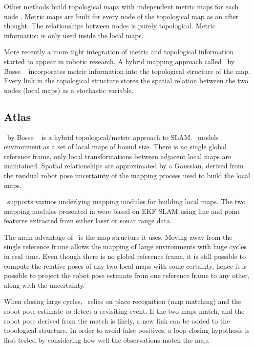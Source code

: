Other methods build topological maps with independent metric maps for
each node \cite{Cho01,Kuipers00}. Metric maps are built for every node of the
topological map as an after thought. The relationships between nodes
is purely topological. Metric information is only used inside the
local maps.

More recently a more tight integration of metric and topological
information started to appear in robotic research. A hybrid mapping
approach called \Atlas\ by Bosse \etal\ \cite{bosse03atlas} incorporates
metric information into the topological structure of the map. Every
link in the topological structure stores the spatial relation between
the two nodes (local maps) as a stochastic variable. 



\subsection{Atlas}

\Atlas\ by Bosse \etal\ \cite{bosse03atlas} is a hybrid
topological/metric approach to SLAM. \Atlas\ models environment as a
set of local maps of bound size. There is no single global reference
frame, only local transformations between adjacent local maps are
maintained. Spatial relationships are approximated by a Gaussian,
derived from the residual robot pose uncertainty of the mapping
process used to build the local maps.

\Atlas\ supports variuos underlying mapping modules for building local
maps. The two mapping modules presented in \cite{bosse03atlas} were
based on EKF SLAM using line and point features extracted from either
laser or sonar range data.

The main advantage of \Atlas\ is the map structure it uses. Moving
away from the single reference frame allows the mapping of large
environments with huge cycles in real time. Even though there is no
global reference frame, it is still possible to compute the relative
poses of any two local maps with some certainty, hence it is possible
to project the robot pose estimate from one reference frame to any
other, along with the uncertainty.


When closing large cycles, \Atlas\ relies on place recognition
(map matching) and the robot pose estimate to detect a revisiting
event. If the two maps match, and the robot pose derived from the
match is likely, a new link can be added to the topological structure.
In order to avoid false positives, a loop closing hypothesis is first
tested by considering how well the observations match the map.

